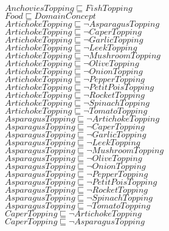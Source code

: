 \documentclass[a4paper,10pt]{article}
\begin{document}
 $AnchoviesTopping \sqsubseteq FishTopping$\\ 
 $Food \sqsubseteq DomainConcept$\\ 
 $ArtichokeTopping \sqsubseteq  \lnot AsparagusTopping$\\ 
 $ArtichokeTopping \sqsubseteq  \lnot CaperTopping$\\ 
 $ArtichokeTopping \sqsubseteq  \lnot GarlicTopping$\\ 
 $ArtichokeTopping \sqsubseteq  \lnot LeekTopping$\\ 
 $ArtichokeTopping \sqsubseteq  \lnot MushroomTopping$\\ 
 $ArtichokeTopping \sqsubseteq  \lnot OliveTopping$\\ 
 $ArtichokeTopping \sqsubseteq  \lnot OnionTopping$\\ 
 $ArtichokeTopping \sqsubseteq  \lnot PepperTopping$\\ 
 $ArtichokeTopping \sqsubseteq  \lnot PetitPoisTopping$\\ 
 $ArtichokeTopping \sqsubseteq  \lnot RocketTopping$\\ 
 $ArtichokeTopping \sqsubseteq  \lnot SpinachTopping$\\ 
 $ArtichokeTopping \sqsubseteq  \lnot TomatoTopping$\\ 
 $AsparagusTopping \sqsubseteq  \lnot ArtichokeTopping$\\ 
 $AsparagusTopping \sqsubseteq  \lnot CaperTopping$\\ 
 $AsparagusTopping \sqsubseteq  \lnot GarlicTopping$\\ 
 $AsparagusTopping \sqsubseteq  \lnot LeekTopping$\\ 
 $AsparagusTopping \sqsubseteq  \lnot MushroomTopping$\\ 
 $AsparagusTopping \sqsubseteq  \lnot OliveTopping$\\ 
 $AsparagusTopping \sqsubseteq  \lnot OnionTopping$\\ 
 $AsparagusTopping \sqsubseteq  \lnot PepperTopping$\\ 
 $AsparagusTopping \sqsubseteq  \lnot PetitPoisTopping$\\ 
 $AsparagusTopping \sqsubseteq  \lnot RocketTopping$\\ 
 $AsparagusTopping \sqsubseteq  \lnot SpinachTopping$\\ 
 $AsparagusTopping \sqsubseteq  \lnot TomatoTopping$\\ 
 $CaperTopping \sqsubseteq  \lnot ArtichokeTopping$\\ 
 $CaperTopping \sqsubseteq  \lnot AsparagusTopping$\\ 
\end{document}
